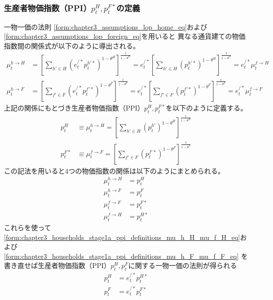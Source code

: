 \subsubsection{生産者物価指数（PPI）\(p_t^H, p_t^{F*}\)の定義}
\label{sec:chapter3_households_stage1a_ppi_definitions}
一物一価の法則
\eqref{form:chapter3_assumptions_lop_home_eq}および
\eqref{form:chapter3_assumptions_lop_foreign_eq}を用いると
異なる通貨建ての物価指数間の関係式が以下のように導出される。
\begin{align}
    \label{form:chapter3_households_stage1a_ppi_definitions_mu_h_H_mu_f_H_eq}
        \mu_t^{h\to H}
        &=\left[\sum_{h'\in H}(e_t^{/*}p_t^{h'*})^{1-\theta^H}\right]^{\frac{1}{1-\theta^H}}
        =e_t^{/*}\left[\sum_{h'\in H}(p_t^{h'*})^{1-\theta^H}\right]^{\frac{1}{1-\theta^H}}
        =e_t^{/*}\mu_t^{f\to H} \\
    \label{form:chapter3_households_stage1a_ppi_definitions_mu_h_F_mu_f_F_eq}
        \mu_t^{h\to F}
        &=\left[\sum_{f'\in F}(e_t^{/*}p_t^{f'*})^{1-\theta^F}\right]^{\frac{1}{1-\theta^F}}
        =e_t^{/*}\left[\sum_{f'\in F}(p_t^{f'*})^{1-\theta^F}\right]^{\frac{1}{1-\theta^F}}
        =e_t^{/*}\mu_t^{f\to F}
\end{align}
上記の関係にもとづき生産者物価指数（PPI）\(p_t^H, p_t^{F*}\)を以下のように定義する。
\begin{align}
    \label{form:chapter3_households_stage1a_p_H_def}
        p_t^H&\equiv\mu_t^{h\to H}=\left[\sum_{h'\in H}(p_t^{h'})^{1-\theta^H}\right]^{\frac{1}{1-\theta^H}} \\
    \label{form:chapter3_households_stage1a_p_F_star_def}
        p_t^{F*}&\equiv\mu_t^{f\to F}=\left[\sum_{f'\in F}(p_t^{f'*})^{1-\theta^F}\right]^{\frac{1}{1-\theta^F}}
\end{align}
この記法を用いると4つの物価指数の関係は以下のようにまとめられる。
\begin{align}
    \label{form:chapter3_households_stage1a_ppi_definitions_mu_h_H_p_H_eq}
        \mu_t^{h\to H}&=p_t^H \\
    \label{form:chapter3_households_stage1a_ppi_definitions_mu_h_F_p_F_eq}
        \mu_t^{h\to F}&=p_t^F \\
    \label{form:chapter3_households_stage1a_ppi_definitions_mu_f_F_p_F_star_eq}
        \mu_t^{f\to F}&=p_t^{F*} \\
    \label{form:chapter3_households_stage1a_ppi_definitions_mu_f_H_p_H_star_eq}
        \mu_t^{f\to H}&=p_t^{H*}
\end{align}
これらを使って
\eqref{form:chapter3_households_stage1a_ppi_definitions_mu_h_H_mu_f_H_eq}および
\eqref{form:chapter3_households_stage1a_ppi_definitions_mu_h_F_mu_f_F_eq}
を書き直せば生産者物価指数（PPI）\(p_t^H, p_t^F\)に関する一物一価の法則が得られる
\begin{align}
    \label{form:chapter3_households_stage1a_ppi_definitions_p_H_lop}
        p_t^H&=e_t^{/*}p_t^{H*}\\
    \label{form:chapter3_households_stage1a_ppi_definitions_p_F_lop}
        p_t^F&=e_t^{/*}p_t^{F*}
\end{align}

